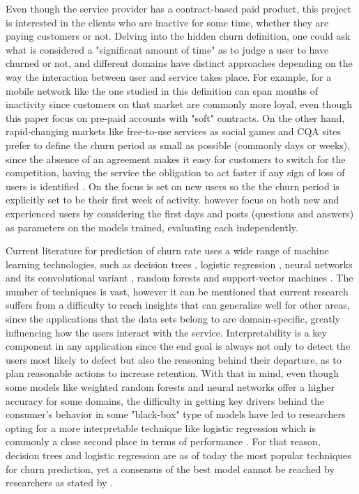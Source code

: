 \documentclass{kththesis}
\begin{document}
Even though the service provider has a contract-based paid product, this project is interested in the clients who are inactive for some time, whether they are paying customers or not. Delving into the hidden churn definition, one could ask what is considered a "significant amount of time" as to judge a user to have churned or not, and different domains have distinct approaches depending on the way the interaction between user and service takes place. For example, for a mobile network like the one studied in \citep{Khan2015} this definition can span months of inactivity since customers on that market are commonly more loyal, even though this paper focus on pre-paid accounts with "soft" contracts. On the other hand, rapid-changing markets like free-to-use services as social games and CQA sites prefer to define the churn period as small as possible (commonly days or weeks), since the absence of an agreement makes it easy for customers to switch for the competition, having the service the obligation to act faster if any sign of loss of users is identified \citep{Khan2015}\citep{Drachen2016RapidPO}. On \citep{Dror2012} the focus is set on new users so the the churn period is explicitly set to be their first week of activity. \citep{Pudipeddi2014} however focus on both new and experienced users by considering the first days and posts (questions and answers) as parameters on the models trained, evaluating each independently.

Current literature for prediction of churn rate uses a wide range of machine learning technologies, such as decision trees \citep{Pudipeddi2014}\citep{Hassouna2015} \citep{Ballings2012} \citep{Khan2015}, logistic regression \citep{GurAli2014}, neural networks \citep{Runge2014} and its convolutional variant \citep{Wangperawong2016}, random forests \citep{Dror2012} and support-vector machines \citep{coussement2008churn}. The number of techniques is vast, however it can be mentioned that current research suffers from a difficulty to reach insights that can generalize well for other areas, since the applications that the data sets belong to are domain-specific, greatly influencing how the users interact with the service. Interpretability is a key component in any application since the end goal is always not only to detect the users most likely to defect but also the reasoning behind their departure, as to plan reasonable actions to increase retention. With that in mind, even though some models like weighted random forests \citep{Burez2009} and neural networks \citep{Runge2014} offer a higher accuracy for some domains, the difficulty in getting key drivers behind the consumer's behavior in some "black-box" type of models have led to researchers opting for a more interpretable technique like logistic regression which is commonly a close second place in terms of performance \citep{Runge2014} \citep{Dror2012}. For that reason, decision trees and logistic regression are as of today the most popular techniques for churn prediction, yet a consensus of the best model cannot be reached by researchers as stated by \citep{mahajan2015review}. 
\end{document}
